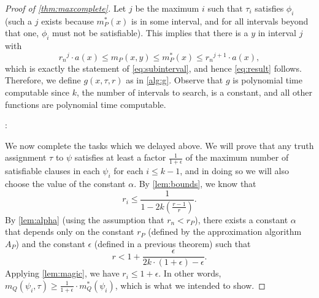 \documentclass[]{article}
\begin{document}
\begin{proof}[Proof of \autoref{thm:maxcomplete}]
  Let $j$ be the maximum $i$ such that $\tau_i$ satisfies $\phi_i$ (such a $j$ exists because $m^*_P(x)$ is in some interval, and for all intervals beyond that one, $\phi_i$ must not be satisfiable).
  This implies that there is a $y$ in interval $j$ with
  \begin{equation*}
    {r_n}^j \cdot a(x) \leq m_P(x, y) \leq m^*_P(x) \leq {r_n}^{j + 1} \cdot a(x),
  \end{equation*}
  which is exactly the statement of \autoref{eq:subinterval}, and hence \autoref{eq:result} follows.
  Therefore, we define $g(x, \tau, r)$ as in \autoref{alg:g}.
  Observe that $g$ is polynomial time computable since $k$, the number of intervals to search, is a constant, and all other functions are polynomial time computable.
  \begin{algorithm}
    \caption{Deterministic polynomial time algorithm that computes a $r_n$-approximate solution for $x$%
      \label{alg:g}}
    \begin{algorithmic}
      \Statex{}
      :
        \EndFor
         \\
        \hspace{1.5em}
      \EndFunction
    \end{algorithmic}
  \end{algorithm}

  We now complete the tasks which we delayed above.
  We will prove that any truth assignment $\tau$ to $\psi$ satisfies at least a factor $\frac{1}{1 + \epsilon}$ of the maximum number of satisfiable clauses in each $\psi_i$ for each $i \leq k - 1$, and in doing so we will also choose the value of the constant $\alpha$.
  By \autoref{lem:bounds}, we know that
  \begin{equation*}
    r_i \leq \frac{1}{1 - 2k\left(\frac{r - 1}{r}\right)}.
  \end{equation*}
  By \autoref{lem:alpha} (using the assumption that $r_n < r_P$), there exists a constant $\alpha$ that depends only on the constant $r_P$ (defined by the approximation algorithm $A_P$) and the constant $\epsilon$ (defined in a previous theorem) such that
  \begin{equation}\label{eq:rupper}
    r < 1 + \frac{\epsilon}{2k \cdot (1 + \epsilon) - \epsilon}.
  \end{equation}
  Applying \autoref{lem:magic}, we have $r_i \leq 1 + \epsilon$.
  In other words, $m_Q(\psi_i, \tau) \geq \frac{1}{1 + \epsilon} \cdot m^*_Q(\psi_i)$, which is what we intended to show.


\end{proof}
\end{document}
